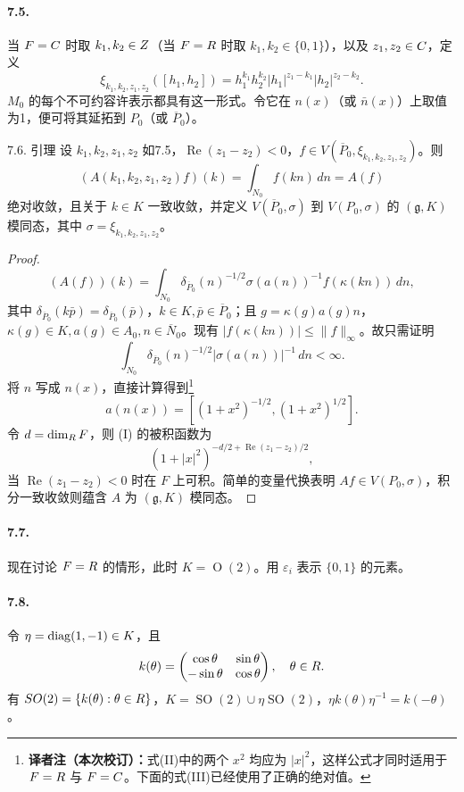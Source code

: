 \paragraph*{7.5.} 当 $F=C$ 时取 $k_1,k_2\in Z$（当 $F=R$ 时取 $k_1,k_2\in\{0,1\}$），以及 $z_1,z_2\in C$，定义
\[
 \xi_{k_1,k_2,z_1,z_2}([h_1,h_2])
 =h_1^{k_1}h_2^{k_2}|h_1|^{z_1-k_1}|h_2|^{z_2-k_2}.
\]
$M_0$ 的每个不可约容许表示都具有这一形式。令它在 $n(x)$（或 $\bar n(x)$）上取值为1，便可将其延拓到 $P_0$（或 $\overline P_0$）。
\begin{originaltheorem}{7.6. 引理}
设 $k_1,k_2,z_1,z_2$ 如7.5，$\operatorname{Re}(z_1-z_2)<0$，$f\in V(\overline P_0,\xi_{k_1,k_2,z_1,z_2})$。则
\[
 (A(k_1,k_2,z_1,z_2)f)(k)=\int_{N_0}f(kn)\,dn=A(f)
\]
绝对收敛，且关于 $k\in K$ 一致收敛，并定义 $V(\overline P_0,\sigma)$ 到 $V(P_0,\sigma)$ 的 $(\mathfrak g,K)$ 模同态，其中 $\sigma=\xi_{k_1,k_2,z_1,z_2}$。
\end{originaltheorem}
\begin{proof}
\[
 (A(f))(k)=\int_{N_0}\delta_{\overline P_0}(n)^{-1/2}
 \sigma(a(n))^{-1}f(\kappa(kn))\,dn,
\]
其中 $\delta_{\overline P_0}(k\bar p)=\delta_{\overline P_0}(\bar p)$，$k\in K,\bar p\in\overline P_0$；且 $g=\kappa(g)a(g)n$，$\kappa(g)\in K,a(g)\in A_0,n\in\overline N_0$。现有 $|f(\kappa(kn))|\le\|f\|_\infty$。故只需证明
\begin{equation}
 \int_{N_0}\delta_{\overline P_0}(n)^{-1/2}|\sigma(a(n))|^{-1}\,dn<\infty.
 \tag{I}
\end{equation}
将 $n$ 写成 $n(x)$，直接计算得到\nobreak\footnote{\textbf{译者注（本次校订）：}式(II)中的两个 $x^2$ 均应为 $|x|^2$，这样公式才同时适用于 $F=R$ 与 $F=C$。下面的式(III)已经使用了正确的绝对值。}
\begin{equation}
 a(n(x))=[(1+x^2)^{-1/2},(1+x^2)^{1/2}].
 \tag{II}
\end{equation}
令 $d=\dim_{R}F$，则 (I) 的被积函数为
\begin{equation}
 (1+|x|^2)^{-d/2+\operatorname{Re}(z_1-z_2)/2},
 \tag{III}
\end{equation}
当 $\operatorname{Re}(z_1-z_2)<0$ 时在 $F$ 上可积。简单的变量代换表明 $Af\in V(P_0,\sigma)$，积分一致收敛则蕴含 $A$ 为 $(\mathfrak g,K)$ 模同态。
\end{proof}
\paragraph*{7.7.} 现在讨论 $F=R$ 的情形，此时 $K=\operatorname O(2)$。用 $\varepsilon_i$ 表示 $\{0,1\}$ 的元素。
\paragraph*{7.8.} 令 $\eta=\diag(1,-1)\in K$，且
\[
 k(\theta)=\begin{pmatrix}\cos\theta&\sin\theta\\-\sin\theta&\cos\theta\end{pmatrix},\quad\theta\in R.
\]
有 $SO(2)=\{k(\theta):\theta\in R\}$，$K=\operatorname{SO}(2)\cup\eta\operatorname{SO}(2)$，$\eta k(\theta)\eta^{-1}=k(-\theta)$。
